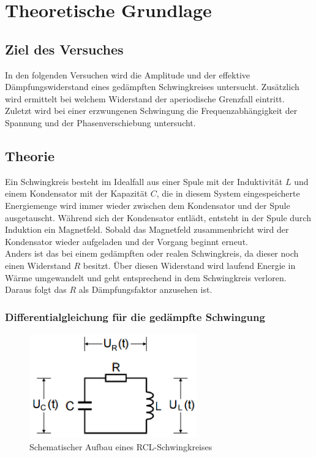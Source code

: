 \section{Theoretische Grundlage}
\label{sec:Theorie}

\subsection{Ziel des Versuches}
In den folgenden Versuchen wird die Amplitude und der effektive Dämpfungswiderstand eines gedämpften Schwingkreises untersucht. Zusätzlich wird ermittelt bei welchem Widerstand der aperiodische Grenzfall eintritt. Zuletzt wird bei einer erzwungenen Schwingung die Frequenzabhängigkeit der Spannung und der Phasenverschiebung untersucht.

\subsection{Theorie}
Ein Schwingkreis besteht im Idealfall aus  einer Spule mit der Induktivität $L$ und einem Kondensator mit der Kapazität $C$, die in diesem System eingespeicherte Energiemenge wird immer wieder zwischen dem Kondensator und der Spule ausgetauscht. Während sich der Kondensator entlädt, entsteht in der Spule durch Induktion ein Magnetfeld. Sobald das Magnetfeld zusammenbricht wird der Kondensator wieder aufgeladen und der Vorgang beginnt erneut. \\
Anders ist das bei einem gedämpften oder realen Schwingkreis, da dieser noch einen Widerstand $R$ besitzt. Über diesen Widerstand wird laufend Energie in Wärme umgewandelt und geht entsprechend in dem Schwingkreis verloren. Daraus folgt das $R$ als Dämpfungsfaktor anzusehen ist.

\subsubsection{Differentialgleichung für die gedämpfte Schwingung}

\begin{figure}
	\centering
	\includegraphics[height=4.5cm]{picture/Theorie1.PNG}
	\caption{Schematischer Aufbau eines RCL-Schwingkreises \cite[1]{sample}}
	\label{fig:RCL}
\end{figure}

